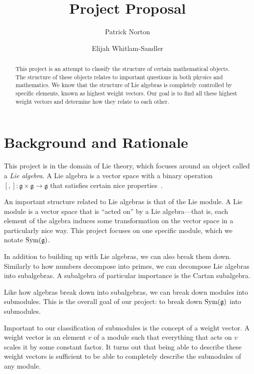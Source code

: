 \documentclass[11pt, reqno]{amsart}
\title{Project Proposal}
\author{Patrick Norton \and Elijah Whitlam-Sandler}
\begin{document}
\maketitle

\begin{abstract}
  This project is an attempt to classify the structure of certain mathematical
  objects. %
  The structure of these objects relates to important questions in both
  physics and mathematics. %
  We know that the structure of Lie algebras is completely controlled by
  specific elements, known as highest weight vectors. Our goal is to find all
  these highest weight vectors and determine how they relate to each other.
\end{abstract}

\section{Background and Rationale}

This project is in the domain of Lie theory, which focuses around an object
called a \emph{Lie algebra}. A Lie algebra is a vector space with a binary
operation $[,]: \mathfrak{g} \times \mathfrak{g} \rightarrow \mathfrak{g}$ that satisfies certain nice properties~\cite{Erd06}.

An important structure related to Lie algebras is that of the Lie module. A Lie
module is a vector space that is ``acted on'' by a Lie algebra---that is, each
element of the algebra induces some transformation on the vector space in a
particularly nice way. This project focuses on one specific module, which we
notate $\operatorname{Sym}(\mathfrak{g})$.

In addition to building up with Lie algebras, we can also break them down.
Similarly to how numbers decompose into primes, we can decompose Lie algebras
into subalgebras. A subalgebra of particular importance is the Cartan
subalgebra.

Like how algebras break down into subalgebras, we can break down modules into
submodules. This is the overall goal of our project: to break down $\operatorname{Sym}(\mathfrak{g})$
into submodules.

Important to our classification of submodules is the concept of a weight vector.
A weight vector is an element $v$ of a module such that everything that acts on
$v$ scales it by some constant factor. It turns out that being able to describe
these weight vectors is sufficient to be able to completely describe the
submodules of any module.
\end{document}
